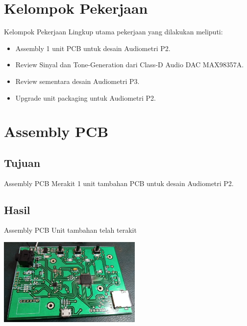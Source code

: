 \documentclass[table,dvipsnames]{beamer}
\begin{document}
	\section{Kelompok Pekerjaan}
	\begin{frame}
	    \begin{exampleblock}{Kelompok Pekerjaan}
			Lingkup utama pekerjaan yang dilakukan meliputi:
			\begin{itemize}
				\item Assembly 1 unit PCB untuk desain Audiometri P2.
				\item Review Sinyal dan Tone-Generation dari Class-D Audio DAC MAX98357A.
				\item Review sementara desain Audiometri P3.
				\item Upgrade unit packaging untuk Audiometri P2.
			\end{itemize}
	    \end{exampleblock}
	\end{frame}
	
	\section{Assembly PCB}
	\begin{frame}
		\subsection{Tujuan}
		\begin{exampleblock}{Assembly PCB}
			Merakit 1 unit tambahan PCB untuk desain Audiometri P2.
		\end{exampleblock}
	
		\subsection{Hasil}
		\begin{exampleblock}{Assembly PCB}
			Unit tambahan telah terakit
			\begin{center}
				\includegraphics[width=200pt]{images/assembly_hasil}
			\end{center}
		\end{exampleblock}
	\end{frame}
\end{document}
